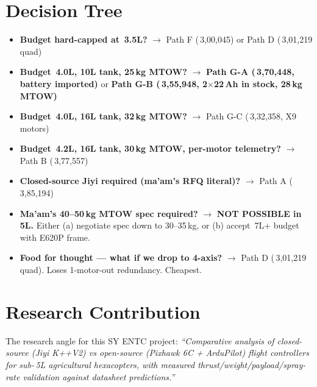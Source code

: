 \documentclass[11pt,a4paper]{article}
\newcommand{\Rs}{\rupee\,}
\begin{document}
\section{Decision Tree}

\begin{itemize}
  \item \textbf{Budget hard-capped at \Rs{}3.5L?} $\rightarrow$ Path F (\Rs{}3,00,045) or Path D (\Rs{}3,01,219 quad)
  \item \textbf{Budget \Rs{}4.0L, 10L tank, 25\,kg MTOW?} $\rightarrow$ \textbf{Path G-A (\Rs{}3,70,448, battery imported)} or \textbf{Path G-B (\Rs{}3,55,948, 2$\times$22\,Ah in stock, 28\,kg MTOW)}
  \item \textbf{Budget \Rs{}4.0L, 16L tank, 32\,kg MTOW?} $\rightarrow$ Path G-C (\Rs{}3,32,358, X9 motors)
  \item \textbf{Budget \Rs{}4.2L, 16L tank, 30\,kg MTOW, per-motor telemetry?} $\rightarrow$ Path B (\Rs{}3,77,557)
  \item \textbf{Closed-source Jiyi required (ma'am's RFQ literal)?} $\rightarrow$ Path A (\Rs{}3,85,194)
  \item \textbf{Ma'am's 40--50\,kg MTOW spec required?} $\rightarrow$ \textbf{NOT POSSIBLE in \Rs{}5L.} Either (a) negotiate spec down to 30--35\,kg, or (b) accept \Rs{}7L+ budget with E620P frame.
  \item \textbf{Food for thought --- what if we drop to 4-axis?} $\rightarrow$ Path D (\Rs{}3,01,219 quad). Loses 1-motor-out redundancy. Cheapest.
\end{itemize}

\section{Research Contribution}

The research angle for this SY ENTC project: \textit{``Comparative analysis of closed-source (Jiyi K++V2) vs open-source (Pixhawk 6C + ArduPilot) flight controllers for sub-\Rs{}5L agricultural hexacopters, with measured thrust/weight/payload/spray-rate validation against datasheet predictions.''}
\end{document}
